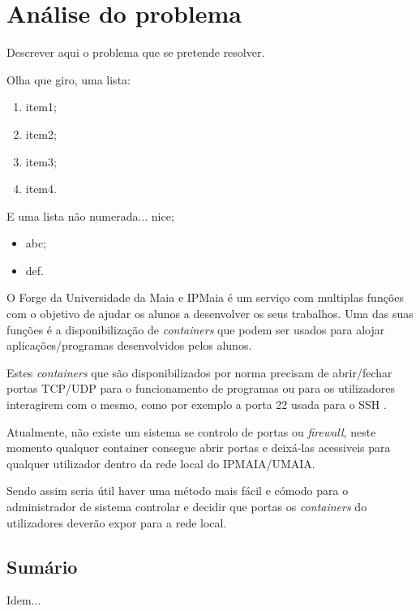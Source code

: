 \chapter{Análise do problema}
\label{cap:problem}

Descrever aqui o problema que se pretende resolver.


Olha que giro, uma lista:

\begin{enumerate}
    \item item1;
    \item item2;
    \item item3;
    \item item4.
\end{enumerate}


E uma lista não numerada... nice;

\begin{itemize}
    \item abc;
    \item def.
\end{itemize}

O Forge da Universidade da Maia e IPMaia é um serviço com multiplas funções com 
o objetivo de ajudar os alunos a desenvolver os seus trabalhos.
Uma das suas funções é a disponibilização de \textit{containers} que podem ser usados
para alojar aplicações/programas desenvolvidos pelos alunos.

Estes \textit{containers} que são disponibilizados por norma precisam de 
abrir/fechar portas TCP/UDP para o funcionamento de programas ou para os
utilizadores interagirem com o mesmo, como por exemplo a porta 22 usada para o 
SSH \cite{rfc4253}.

Atualmente, não existe um sistema se controlo de portas ou \textit{firewall}, neste momento qualquer container
consegue abrir portas e deixá-las acessiveis para qualquer utilizador dentro da rede local
do IPMAIA/UMAIA.

Sendo assim seria útil haver uma método mais fácil e cómodo para o administrador de sistema
controlar e decidir que portas os \textit{containers} do utilizadores deverão expor para a rede local.



\section*{Sumário}

Idem... 